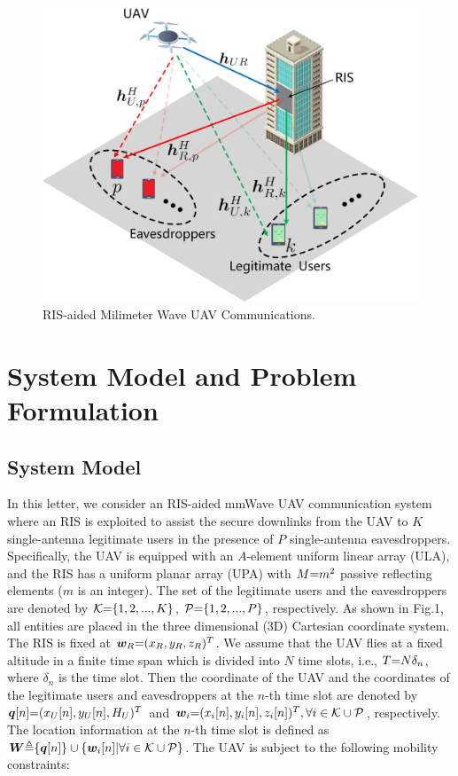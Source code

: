 \documentclass[12pt, draftclsnofoot, onecolumn]{IEEEtran}
\begin{document}
\begin{figure}[t]
	\centering
	\includegraphics[width=0.7\linewidth]{./plot/eps/system_with_H.eps}%
	\caption{RIS-aided Milimeter Wave UAV Communications.}  %
\end{figure}

\section{System Model and Problem Formulation}

\subsection{System Model}
In this letter, we consider an RIS-aided mmWave UAV communication system where an RIS is exploited to assist the secure downlinks from the UAV to $K$ single-antenna legitimate users in the presence of $P$ single-antenna eavesdroppers. Specifically, the UAV is equipped with an $A$-element uniform linear array (ULA), and the RIS has a uniform planar array (UPA) with $M{\rm =}m^2$ passive reflecting elements ($m$ is an integer). The set of the legitimate users and the eavesdroppers are denoted by ${\cal K}{\rm =}\{ 1,2,...,K \}$, ${\cal P}{\rm =}\{1,2,...,P \}$, respectively. As shown in Fig.1, all entities are placed in the three dimensional (3D) Cartesian coordinate system. The RIS is fixed at ${\bm{w}}_{R}{\rm{ = }}(x_R,y_R,z_R)^T$. We assume that the UAV flies at a fixed altitude in a finite time span which is divided into $N$ time slots, i.e., $T{\rm{ = }}N\delta_n$, where $\delta_n$ is the time slot. Then the coordinate of the UAV and the coordinates of the legitimate users and eavesdroppers at the $n$-th time slot are denoted by ${\bm{q}}[n]{\rm{ = }}(x_U[n],y_U[n],H_{U})^T$ and ${\bm{w}}_{i}{\rm{ = }}(x_i[n],y_i[n],z_i[n])^T,\forall i \in {\cal K}\cup{\cal P}$, respectively. The location information at the $n$-th time slot is defined as ${\bm W}{\rm \triangleq}\{{\bm q}[n]\}\cup \{{\bm w}_i[n]|\forall i \in {\cal K}\cup {\cal P}\}$. The UAV is subject to the following mobility constraints:
\end{document}

